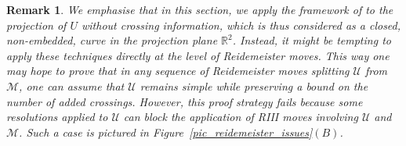 \documentclass{article}
\newtheorem{remark}[theorem]{Remark}
\begin{document}
\begin{remark}
We emphasise that in this section, we apply the framework of  to the \emph{projection} of $U$ without crossing information, which is thus considered as a closed, non-embedded, curve in the projection plane $\mathbb{R}^2$. Instead, it might be tempting to apply these techniques \emph{directly at the level of Reidemeister moves}. This way one may hope to prove that in any sequence of Reidemeister moves splitting $\mathcal{U}$ from $\mathcal{M}$, one can assume that $\mathcal{U}$ remains simple while preserving a bound on the number of added crossings. However, this proof strategy fails because some resolutions applied to $\mathcal{U}$ can block the application of RIII moves involving $\mathcal{U}$ and $\mathcal{M}$. Such a case is pictured in Figure~\ref{pic_reidemeister_issues}$(B)$.
\end{remark}
\end{document}
